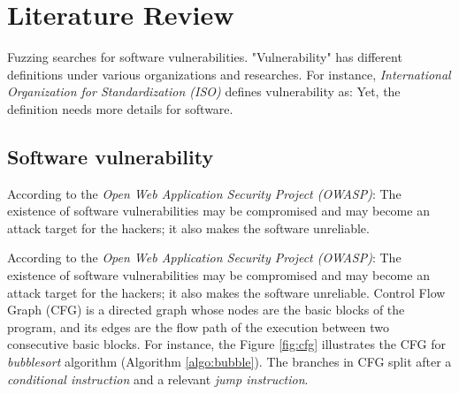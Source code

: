 \section{Literature Review} \label{sec:2.2}

Fuzzing searches for software vulnerabilities. "Vulnerability" has different definitions under various organizations and researches. For instance, \textit{International Organization for Standardization (ISO)} defines vulnerability as:  \cite{iso27008} Yet, the definition needs more details for software. 

\subsection*{Software vulnerability}

According to the \textit{Open Web Application Security Project (OWASP)}:  The existence of software vulnerabilities may be compromised and may become an attack target for the hackers; it also makes the software unreliable. 



According to the \textit{Open Web Application Security Project (OWASP)}:  The existence of software vulnerabilities may be compromised and may become an attack target for the hackers; it also makes the software unreliable. Control Flow Graph (CFG) is a directed graph whose nodes are the basic blocks of the program, and its edges are the flow path of the execution between two consecutive basic blocks. For instance, the Figure \ref{fig:cfg} illustrates the CFG for \textit{bubblesort} algorithm (Algorithm \ref{algo:bubble}). The branches in CFG split after a \textit{conditional instruction} and a relevant \textit{jump instruction}.

